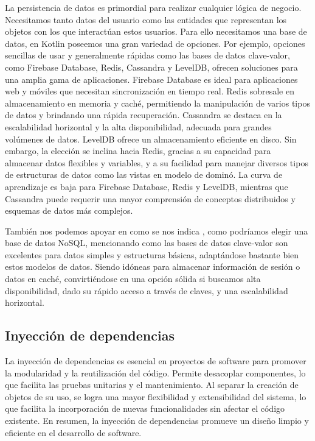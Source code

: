 La persistencia de datos es primordial para realizar cualquier lógica de negocio. Necesitamos tanto 
datos del usuario como las entidades que representan los objetos con los que interactúan estos 
usuarios. Para ello necesitamos una base de datos, en Kotlin poseemos una gran variedad de opciones. Por 
ejemplo, opciones sencillas de usar y generalmente rápidas como las bases de datos clave-valor, como Firebase 
Database, Redis, Cassandra y LevelDB, ofrecen soluciones para una amplia gama de aplicaciones. Firebase 
Database es ideal para aplicaciones web y móviles que necesitan sincronización en tiempo real. Redis 
sobresale en almacenamiento en memoria y caché, permitiendo la manipulación de varios tipos de datos y 
brindando una rápida recuperación. Cassandra se destaca en la escalabilidad horizontal y la alta 
disponibilidad, adecuada para grandes volúmenes de datos. LevelDB ofrece un almacenamiento eficiente en 
disco. Sin embargo, la elección se inclina hacia Redis, gracias a su capacidad para almacenar datos flexibles 
y variables, y a su facilidad para manejar diversos tipos de estructuras de datos como las vistas en modelo 
de dominó. La curva de aprendizaje es baja para Firebase Database, Redis y LevelDB, mientras que Cassandra 
puede requerir una mayor comprensión de conceptos distribuidos y esquemas de datos más complejos.

También nos podemos apoyar en como se nos indica \cite{NosqlDist}, como podríamos elegir una base de datos 
NoSQL, mencionando como las bases de datos clave-valor son excelentes para datos simples y estructuras 
básicas, adaptándose bastante bien estos modelos de datos. Siendo idóneas para almacenar información de 
sesión o datos en caché, convirtiéndose en una opción sólida si buscamos alta disponibilidad, dado su rápido 
acceso a través de claves, y una escalabilidad horizontal.


\subsection{Inyección de dependencias}


La inyección de dependencias es esencial en proyectos de software \cite{DIart}\cite{BenDI} para 
promover la modularidad y la reutilización del código. Permite desacoplar componentes, lo que facilita 
las pruebas unitarias y el mantenimiento. Al separar la creación de objetos de su uso, se logra una 
mayor flexibilidad y extensibilidad del sistema, lo que facilita la incorporación de nuevas 
funcionalidades sin afectar el código existente. En resumen, la inyección de dependencias promueve un 
diseño limpio y eficiente en el desarrollo de software.

